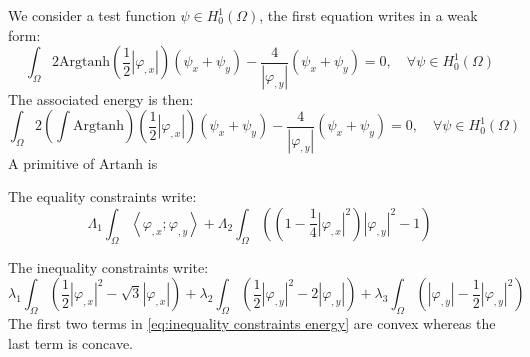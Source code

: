We consider a test function $\psi \in H^1_0(\Omega)$, the first equation writes in a weak form:
\begin{equation}
\label{eq:weak form}
\int_{\Omega} 2\mathrm{Argtanh}(\frac12 |\varphi_{,x}|)(\psi_x + \psi_y) - \frac{4}{|\varphi_{,y}|}(\psi_x + \psi_y) = 0, \quad \forall \psi \in H^1_0(\Omega)
\end{equation}
The associated energy is then: 
\begin{equation}
\label{eq:energy}
\int_{\Omega} 2\left( \int \mathrm{Argtanh} \right)(\frac12 |\varphi_{,x}|)(\psi_x + \psi_y) - \frac{4}{|\varphi_{,y}|}(\psi_x + \psi_y) = 0, \quad \forall \psi \in H^1_0(\Omega)
\end{equation}
A primitive of $\mathrm{Artanh}$ is 

The equality constraints write: 
\begin{equation}
\Lambda_1 \int_{\Omega} \left\langle \varphi_{,x} ; \varphi_{,y} \right\rangle + \Lambda_2 \int_{\Omega} \left( (1 - \frac14 |\varphi_{,x}|^2) |\varphi_{,y}|^2 - 1 \right)
\end{equation}

The inequality constraints write:
\begin{equation}
\label{eq:inequality constraints energy}
\lambda_1 \int_{\Omega} \left(\frac12 |\varphi_{,x}|^2 - \sqrt{3} |\varphi_{,x}| \right) + \lambda_2 \int_{\Omega} \left(\frac12 |\varphi_{,y}|^2 - 2 |\varphi_{,y}| \right) + \lambda_3 \int_{\Omega} \left(|\varphi_{,y}| - \frac12 |\varphi_{,y}|^2 \right)
\end{equation}
The first two terms in \eqref{eq:inequality constraints energy} are convex whereas the last term is concave. 






